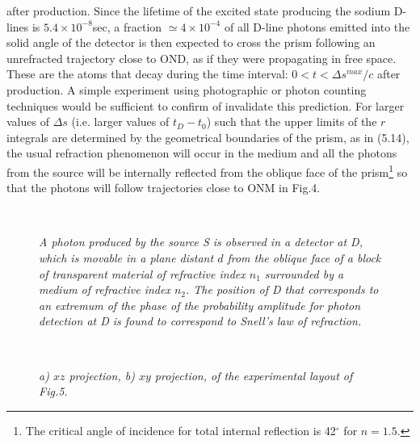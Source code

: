 {     after production. Since the lifetime of the excited state producing
     the sodium D-lines is $5.4 \times 10^{-8}$sec, a fraction $\simeq   4 \times 10^{-4}$ 
     of all D-line photons emitted into the solid angle of the 
     detector is then expected to cross the prism following an unrefracted
     trajectory close to OND, as if they were propagating in free space.
      These are the atoms that decay during the
     time interval: $0 < t < \Delta s^{max}/c$ after production.
     A simple experiment using photographic or
     photon counting techniques would be sufficient to confirm of invalidate 
     this prediction. For larger values of $\Delta s$ (i.e. larger values of $t_D-t_0$)
     such that the upper limits of the $r$ integrals are determined by the geometrical
     boundaries of the prism, as in (5.14), the usual refraction phenomenon will
    occur in the medium and all the photons from the source will be internally
    reflected from the oblique face of the prism\footnote{The critical angle of
    incidence for total internal reflection is 42$^{\circ}$ for $n = 1.5$.} 
    so that the photons will follow trajectories close to ONM in Fig.4.





\begin{figure}[htbp]
\begin{center}
\hspace*{-0.5cm}\mbox{
}
\caption{{\sl A photon produced by the source S is observed in a detector at D, which
 is movable in a plane distant $d$  from the oblique face of a block of
 transparent material of refractive index $n_1$ surrounded by a medium of 
 refractive index $n_2$. The position of D that 
 corresponds to an extremum of the phase of the probability amplitude for
 photon detection at D is found to correspond to Snell's law of 
 refraction.}} 
\label{fig-fig5}
\end{center}
\end{figure}

\begin{figure}[htbp]
\begin{center}
\hspace*{-0.5cm}\mbox{
}
\caption{{\sl a) $xz$ projection, b) $xy$ projection, of the experimental
 layout of Fig.5.}} 
\label{fig-fig6}
\end{center}
\end{figure}

}

